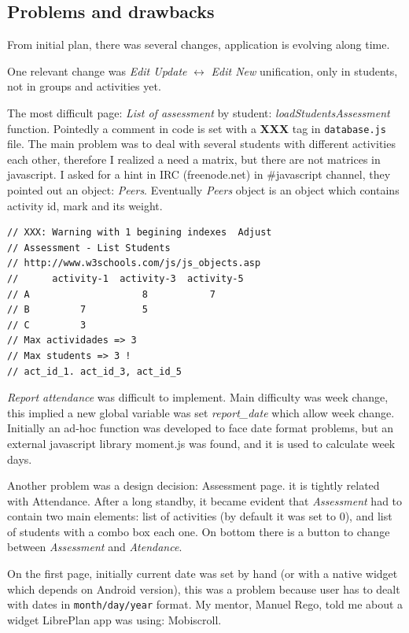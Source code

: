 \subsection{Problems and drawbacks}
 From initial plan, there was several changes, application is evolving along time. 
 
One relevant change was \emph{Edit Update} $\leftrightarrow $ \emph{Edit New} unification, only in students, 
not in groups and activities yet.
    
The most difficult page: \emph{List of assessment} by student: \emph{loadStudentsAssessment} function.
 Pointedly a comment in code is set with a {\bf XXX} tag in \texttt{database.js} file. The main problem
 was to deal with several students with different activities each other, therefore I realized a need
 a matrix, but there are not matrices in javascript.
 I asked for a hint in IRC (freenode.net) in \#javascript channel, they pointed out
 an object: \emph{Peers}. Eventually \emph{Peers} object is an object which contains activity id, mark and its weight.
 
 
\begin{shadowblock}{13cm}
\begin{verbatim}
// XXX: Warning with 1 begining indexes  Adjust
// Assessment - List Students
// http://www.w3schools.com/js/js_objects.asp
//      activity-1  activity-3  activity-5
// A                    8           7
// B         7          5
// C         3
// Max actividades => 3
// Max students => 3 !
// act_id_1. act_id_3, act_id_5   
\end{verbatim} 
\end{shadowblock}
  
\emph{Report attendance} was difficult to implement. Main difficulty was week change, this  implied a new global variable 
  was set \emph{report\_date}  which allow week change.
  Initially an ad-hoc function was developed to face date format problems,
  but an external javascript library moment.js was found, and it is 
  used to calculate week days.

Another problem was a design decision: Assessment page.
it is tightly related with Attendance. After a long standby, it became evident that
 \emph{Assessment} had to contain two main elements:
list of activities (by default it was set to 0), and list of students with
a combo box each one. On bottom there is a button to change between \textit{Assessment} and
\textit{Atendance}.

 On the first page, initially current date was set by hand (or with a native widget which depends on Android version),
  this was a problem  because user has to dealt with dates in \texttt{month/day/year} format. 
My mentor, Manuel Rego, told me about a widget LibrePlan app \cite{LibreplanApp} was using: 
  Mobiscroll\cite{Mobiscroll}.
  
